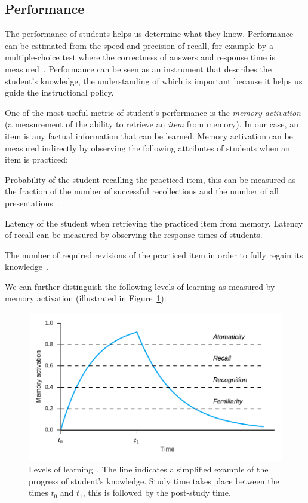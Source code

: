 \subsection{Performance}

The performance of students helps us determine what they know. Performance can be estimated from the speed and precision of recall, for example by a multiple-choice test where the correctness of answers and response time is measured~\cite{Lewis}. Performance can be seen as an instrument that describes the student's knowledge, the understanding of which is important because it helps us guide the instructional policy.

One of the most useful metric of student's performance is the \textit{memory activation} (a measurement of the ability to retrieve an \textit{item} from memory). In our case, an item is any factual information that can be learned. Memory activation can be measured indirectly by observing the following attributes of students when an item is practiced:

\begin{description}[leftmargin=0cm]
  \item[Probability of recall] Probability of the student recalling the practiced item, this can be measured as the fraction of the number of successful recollections and the number of all presentations~\cite{Lewis}.
  \item[Latency of recall] Latency of the student when retrieving the practiced item from memory. Latency of recall can be measured by observing the response times of students\cite{Lewis}.
  \item[Savings in relearning] The number of required revisions of the practiced item in order to fully regain its knowledge~\cite{Lewis,MichaelW.Eysenck2008}.
\end{description}

We can further distinguish the following levels of learning as measured by memory activation (illustrated in Figure~\ref{fig:knowledge-levels}):

\begin{figure}[htbp]
  \centering
  \includegraphics[width=\textwidth]{img/knowledge-levels}
  \caption{Levels of learning~\cite{Lewis}. The line indicates a simplified example of the progress of student's knowledge. Study time takes place between the times $t_0$ and $t_1$, this is followed by the post-study time.}
  \label{fig:knowledge-levels}
\end{figure}

